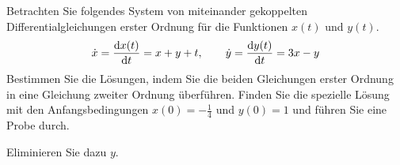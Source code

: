 \begin{atiTask}[
  title = Gekoppelte Differentialgleichungen
]
  Betrachten Sie folgendes System von miteinander gekoppelten Differentialgleichungen erster Ordnung für die Funktionen $x(t)$ und $y(t)$.
  \[
    \timeDerivative{x} = \leibnizDerivative{x(t)}{t} = x + y + t
    \separate
    \timeDerivative{y} = \leibnizDerivative{y(t)}{t} = 3x - y
  \]
  Bestimmen Sie die Lösungen, indem Sie die beiden Gleichungen erster Ordnung in eine Gleichung zweiter Ordnung überführen.
  Finden Sie die spezielle Lösung mit den Anfangsbedingungen $x(0)=-\frac{1}{4}$ und $y(0)=1$ und führen Sie eine Probe durch.

  \begin{atiNote}
    Eliminieren Sie dazu $y$.
  \end{atiNote}
\end{atiTask}